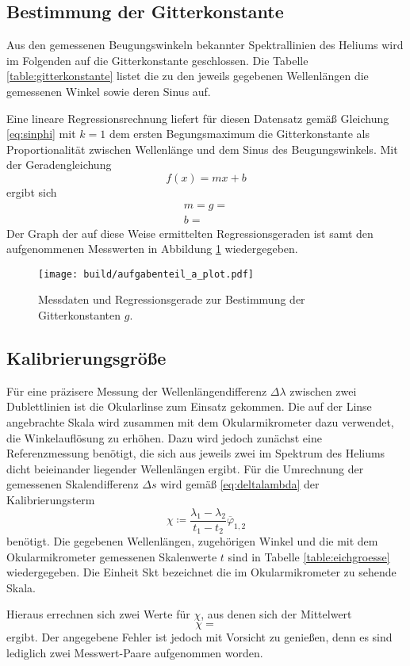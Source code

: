 \subsection{Bestimmung der Gitterkonstante}
\label{sec:gitterkonstante}
Aus den gemessenen Beugungswinkeln bekannter Spektrallinien des Heliums wird im Folgenden auf die Gitterkonstante geschlossen. Die Tabelle \ref{table:gitterkonstante} listet die zu den jeweils gegebenen Wellenlängen die gemessenen Winkel sowie deren Sinus auf.

Eine lineare Regressionsrechnung liefert für diesen Datensatz gemäß Gleichung \eqref{eq:sinphi} mit $k=1$ dem ersten Begungsmaximum die Gitterkonstante als Proportionalität zwischen Wellenlänge und dem Sinus des Beugungswinkels. Mit der Geradengleichung
\begin{equation*}
  f(x) = mx+b
\end{equation*}
ergibt sich
\begin{align*}
  m = g = \\
  b = 
\end{align*}
Der Graph der auf diese Weise ermittelten Regressionsgeraden ist samt den aufgenommenen Messwerten in Abbildung \ref{fig:linreg} wiedergegeben.
\begin{figure}
  \centering
  \texttt{[image: build/aufgabenteil\_a\_plot.pdf]}
  \caption{Messdaten und Regressionsgerade zur Bestimmung der Gitterkonstanten $g$.}
  \label{fig:linreg}
\end{figure}

\subsection{Kalibrierungsgröße}
Für eine präzisere Messung der Wellenlängendifferenz $\Delta \lambda$ zwischen zwei Dublettlinien ist die Okularlinse zum Einsatz gekommen. Die auf der Linse angebrachte Skala wird zusammen mit dem Okularmikrometer dazu verwendet, die Winkelauflösung zu erhöhen. Dazu wird jedoch zunächst eine Referenzmessung benötigt, die sich aus jeweils zwei im Spektrum des Heliums dicht beieinander liegender Wellenlängen ergibt. Für die Umrechnung der gemessenen Skalendifferenz $\Delta s$ wird gemäß \eqref{eq:deltalambda} der Kalibrierungsterm
\begin{equation*}
  \chi \coloneq \frac{\lambda_1 - \lambda_2}{t_1 - t_2}\overline{\varphi}_{1,2}
\end{equation*}
benötigt. Die gegebenen Wellenlängen, zugehörigen Winkel und die mit dem Okularmikrometer gemessenen Skalenwerte $t$ sind in Tabelle \ref{table:eichgroesse} wiedergegeben. Die Einheit Skt bezeichnet die im Okularmikrometer zu sehende Skala.

Hieraus errechnen sich zwei Werte für $\chi$, aus denen sich der Mittelwert
\begin{equation*}
  \chi = 
\end{equation*}
ergibt. Der angegebene Fehler ist jedoch mit Vorsicht zu genießen, denn es sind lediglich zwei Messwert-Paare aufgenommen worden.

